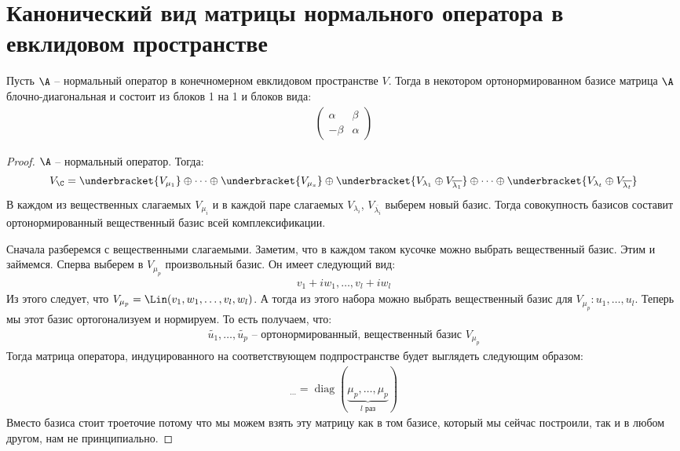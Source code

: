 \section{Канонический вид матрицы нормального оператора в евклидовом пространстве}
\begin{theorem}
    Пусть $\A$ -- нормальный оператор в конечномерном евклидовом пространстве $V$.
    Тогда в некотором ортонормированном базисе матрица $\A$ блочно-диагональная и состоит из блоков 1 на 1 и блоков вида:
    \begin{gather*}
        \left(\begin{array}{cc}
            \alpha & \beta \\ 
            -\beta & \alpha
        \end{array}\right)
    \end{gather*}
\begin{proof}
    $\A$ -- нормальный оператор. Тогда:
    \begin{gather*}
        V_{\C} = \underbracket{V_{\mu_1}} \oplus \dots \oplus \underbracket{V_{\mu_s}} \oplus \underbracket{V_{\lambda_1} \oplus V_{\overline{\lambda_1}}} \oplus \dots \oplus \underbracket{V_{\lambda_t} \oplus V_{\overline{\lambda_t}}}
    \end{gather*}
    В каждом из вещественных слагаемых $V_{\mu_i}$ и в каждой паре слагаемых $V_{\lambda_i}$, $V_{\overline{\lambda_i}}$ выберем новый базис. 
    Тогда совокупность базисов составит ортонормированный вещественный базис всей комплексификации.
    
    Сначала разберемся с вещественными слагаемыми.
    Заметим, что в каждом таком кусочке можно выбрать вещественный базис.
    Этим и займемся. 
    Сперва выберем в $V_{\mu_p}$ произвольный базис. Он имеет следующий вид:
    \begin{gather*}
        v_1 + iw_1, \dots, v_l + i w_l
    \end{gather*}
    Из этого следует, что $V_{\mu_p} = \Lin (v_1, w_1, \dots, v_l, w_l)$. А тогда
    из этого набора можно выбрать вещественный базис для $V_{\mu_p}: u_1, \dots, u_l$. 
    Теперь мы этот базис ортогонализуем и нормируем. То есть получаем, что:
    \begin{gather*}
        \widetilde{u_1}, \dots, \widetilde{u_p} \text{ -- ортонормированный, вещественный базис } V_{\mu_p}
    \end{gather*}
    Тогда матрица оператора, индуцированного на соответствующем подпространстве будет выглядеть следующим образом: 
    \begin{gather*}
        [\A \, |_{V_{\mu_p} }]_{\dots} = \operatorname{diag} (\underbrace{\mu_p, \dots, \mu_p}_{\text{$l$ раз}})
    \end{gather*}
    Вместо базиса стоит троеточие потому что мы можем взять эту матрицу как в том базисе, который мы сейчас построили, так 
    и в любом другом, нам не принципиально. 


\end{proof}
\end{theorem}
